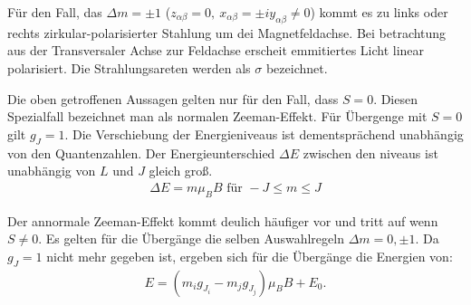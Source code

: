 Für den Fall, das $\Delta m = \pm 1$ ($z_{\alpha\beta} = 0,\ x_{\alpha\beta} = \pm i y_{\alpha\beta} \neq 0$) kommt es zu links oder rechts zirkular-polarisierter Stahlung um dei Magnetfeldachse.
Bei betrachtung aus der Transversaler Achse zur Feldachse erscheit emmitiertes Licht linear polarisiert.
Die Strahlungsareten werden als $\sigma$ bezeichnet.

Die oben getroffenen Aussagen gelten nur für den Fall, dass $S=0$.
Diesen Spezialfall bezeichnet man als normalen Zeeman-Effekt.
Für Übergenge mit $S=0$ gilt $g_J = 1$. Die Verschiebung der Energieniveaus ist dementsprächend unabhängig von den Quantenzahlen.
Der Energieunterschied $\Delta E$ zwischen den niveaus ist unabhängig von $L$ und $J$ gleich groß.
\begin{align}
  \Delta E = m \mu_B B \text{ für } -J \leq m \leq J
  \label{eqn:normal}
\end{align}

Der annormale Zeeman-Effekt kommt deulich häufiger vor und tritt auf wenn $S \neq 0$.
Es gelten für die Übergänge die selben Auswahlregeln $\Delta m = 0, \pm 1$.
Da $g_J = 1$ nicht mehr gegeben ist, ergeben sich für die Übergänge die Energien von:
\begin{align}
	E=(m_ig_{J_i}-m_jg_{J_j})\mu_BB+E_0.
  \label{eqn:anormal}
\end{align}
